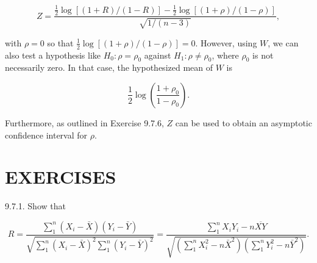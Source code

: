 \begin{equation*}
Z=\frac{\frac{1}{2} \log [(1+R) /(1-R)]-\frac{1}{2} \log [(1+\rho) /(1-\rho)]}{\sqrt{1 /(n-3)}}, \tag{9.7.5}
\end{equation*}


with $\rho=0$ so that $\frac{1}{2} \log [(1+\rho) /(1-\rho)]=0$. However, using $W$, we can also test a hypothesis like $H_{0}: \rho=\rho_{0}$ against $H_{1}: \rho \neq \rho_{0}$, where $\rho_{0}$ is not necessarily zero. In that case, the hypothesized mean of $W$ is

$$
\frac{1}{2} \log \left(\frac{1+\rho_{0}}{1-\rho_{0}}\right) .
$$

Furthermore, as outlined in Exercise 9.7.6, $Z$ can be used to obtain an asymptotic confidence interval for $\rho$.

\section*{EXERCISES}
9.7.1. Show that

$$
R=\frac{\sum_{1}^{n}\left(X_{i}-\bar{X}\right)\left(Y_{i}-\bar{Y}\right)}{\sqrt{\sum_{1}^{n}\left(X_{i}-\bar{X}\right)^{2} \sum_{1}^{n}\left(Y_{i}-\bar{Y}\right)^{2}}}=\frac{\sum_{1}^{n} X_{i} Y_{i}-n \overline{X Y}}{\sqrt{\left(\sum_{1}^{n} X_{i}^{2}-n \bar{X}^{2}\right)\left(\sum_{1}^{n} Y_{i}^{2}-n \bar{Y}^{2}\right)}} .
$$

